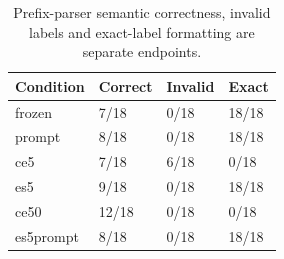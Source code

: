 \begin{table}[t]
\centering\small
\caption{Prefix-parser semantic correctness, invalid labels and exact-label formatting are separate endpoints.}
\label{tab:t4_format_compliance}
\begin{tabularx}{\linewidth}{lXXX}
\toprule
Condition & Correct & Invalid & Exact \\ \midrule
frozen & 7/18 & 0/18 & 18/18 \\
prompt & 8/18 & 0/18 & 18/18 \\
ce5 & 7/18 & 6/18 & 0/18 \\
es5 & 9/18 & 0/18 & 18/18 \\
ce50 & 12/18 & 0/18 & 0/18 \\
es5prompt & 8/18 & 0/18 & 18/18 \\
\bottomrule
\end{tabularx}
\end{table}
